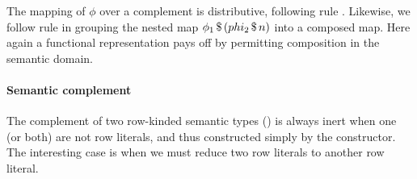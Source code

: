 \documentclass[sigplan,screen]{acmart}
\begin{document}
The mapping of $\phi$ over a complement is distributive, following rule . Likewise, we follow rule  in grouping the nested map ${\phi_1} \, \mathdollar \, ({phi_2} \, \mathdollar \, n)$ into a composed map. Here again a functional representation pays off by permitting composition in the semantic domain.

\paragraph{Semantic complement} The complement of two row-kinded semantic types () is always inert when one (or both) are not row literals, and thus constructed simply by the  constructor. The interesting case is when we must reduce two row literals to another row literal.
\end{document}
